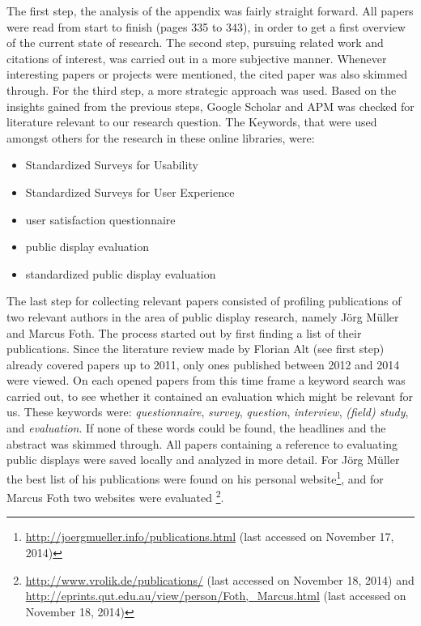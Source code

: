 	The first step, the analysis of the appendix was fairly straight forward. All papers were read from start to finish (pages 335 to 343), in order to get a first overview of the current state of research. 
	The second step, pursuing related work and citations of interest, was carried out in a more subjective manner. Whenever interesting papers or projects were mentioned, the cited paper was also skimmed through. 
	For the third step, a more strategic approach was used. Based on the insights gained from the previous steps, Google Scholar and APM was checked for literature relevant to our research question. The Keywords, that were used amongst others for the research in these online libraries, were:
	\begin{itemize}[itemsep=0pt] 
	\item Standardized Surveys for Usability
	\item Standardized Surveys for User Experience
	\item user satisfaction questionnaire
	\item public display evaluation
	\item standardized public display evaluation
	\end{itemize}

	The last step for collecting relevant papers consisted of profiling publications of two relevant authors in the area of public display research, namely J\"org M\"uller and Marcus Foth. The process started out by first finding a list of their publications. Since the literature review made by Florian Alt (see first step) already covered papers up to 2011, only ones published between 2012 and 2014 were viewed. 
	On each opened papers from this time frame a keyword search was carried out, to see whether it contained an evaluation which might be relevant for us. These keywords were: \textit{questionnaire}, \textit{survey}, \textit{question}, \textit{interview}, \textit{(field) study}, and \textit{evaluation}. If none of these words could be found, the headlines and the abstract was skimmed through. All papers containing a reference to evaluating public displays were saved locally and analyzed in more detail.
	For J\"org M\"uller the best list of his publications were found on his personal website\footnote{\url{http://joergmueller.info/publications.html} (last accessed on November 17, 2014)}, and for Marcus Foth two websites were evaluated \footnote{\url{http://www.vrolik.de/publications/} (last accessed on November 18, 2014) and \url{http://eprints.qut.edu.au/view/person/Foth,_Marcus.html} (last accessed on November 18, 2014)}. 

